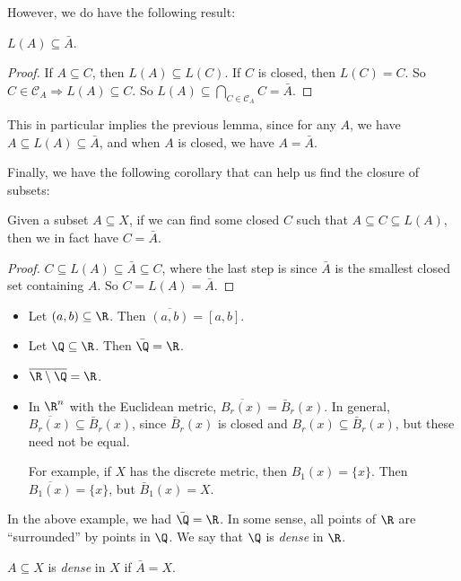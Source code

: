 \documentclass[a4paper]{article}
\begin{document}
However, we do have the following result:

\begin{prop}
  $L(A) \subseteq \bar A$.
\end{prop}

\begin{proof}
  If $A\subseteq C$, then $L(A) \subseteq L(C)$. If $C$ is closed, then $L(C) = C$. So $C\in \mathcal{C}_A \Rightarrow L(A) \subseteq C$. So $L(A) \subseteq \bigcap_{C\in \mathcal{C}_A}C = \bar A$.
\end{proof}
This in particular implies the previous lemma, since for any $A$, we have $A \subseteq L(A) \subseteq \bar{A}$, and when $A$ is closed, we have $A = \bar{A}$.

Finally, we have the following corollary that can help us find the closure of subsets:
\begin{cor}
  Given a subset $A \subseteq X$, if we can find some closed $C$ such that $A \subseteq C \subseteq L(A)$, then we in fact have $C = \bar{A}$.
\end{cor}

\begin{proof}
  $C\subseteq L(A) \subseteq \bar A \subseteq C$, where the last step is since $\bar A$ is the smallest closed set containing $A$. So $C = L(A) = \bar A$.
\end{proof}

\begin{eg}\leavevmode
  \begin{itemize}
    \item Let $(a, b)\subseteq \R$. Then $\overline{(a, b)} = [a, b]$.
    \item Let $\Q\subseteq \R$. Then $\bar\Q = \R$.
    \item $\overline{\R \setminus \Q} = \R$.
    \item In $\R^n$ with the Euclidean metric, $\overline{B_r(x)} = \bar B_r(x)$. In general, $\overline{B_r(x)}\subseteq \bar B_r(x)$, since $\bar B_r(x)$ is closed and $B_r(x) \subseteq \bar B_r(x)$, but these need not be equal.

      For example, if $X$ has the discrete metric, then $B_1(x) = \{x\}$. Then $\overline{B_1(x)} = \{x\}$, but $\bar B_1(x) = X$.
  \end{itemize}
\end{eg}

In the above example, we had $\bar\Q = \R$. In some sense, all points of $\R$ are ``surrounded'' by points in $\Q$. We say that $\Q$ is \emph{dense} in $\R$.
\begin{defi}
  $A\subseteq X$ is \emph{dense} in $X$ if $\bar A = X$.
\end{defi}
\end{document}

